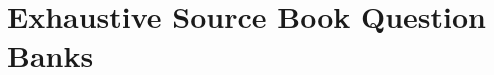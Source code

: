 \documentclass[11pt,a4paper,oneside]{report}
\begin{document}
\newpage
\part{Exhaustive Source Book Question Banks}







\end{document}
